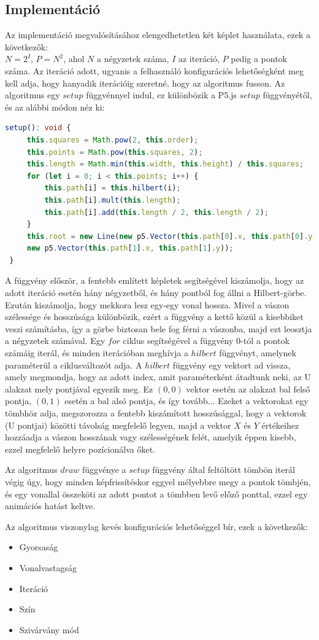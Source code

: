 \subsection*{Implementáció}
Az implementáció megvalósításához elengedhetetlen két képlet használata, ezek a következők:\\
$N = 2^I$,
$P = N^2$, ahol $N$ a négyzetek száma, $I$ az iteráció, $P$ pedig a pontok száma. Az iteráció adott, ugyanis a felhasználó konfigurációs lehetőségként meg kell adja, hogy hanyadik iterációig szeretné, hogy az algoritmus fusson. 
Az algoritmus egy $setup$ függvénnyel indul, ez különbözik a P5.js $setup$ függvényétől, és az alábbi módon néz ki:
\begin{lstlisting}[language=typescript]
 setup(): void {
	 this.squares = Math.pow(2, this.order);
	 this.points = Math.pow(this.squares, 2);
	 this.length = Math.min(this.width, this.height) / this.squares;
	 for (let i = 0; i < this.points; i++) {
		 this.path[i] = this.hilbert(i);
		 this.path[i].mult(this.length);
		 this.path[i].add(this.length / 2, this.length / 2);
	 }
	 this.root = new Line(new p5.Vector(this.path[0].x, this.path[0].y),
	 new p5.Vector(this.path[1].x, this.path[1].y));
 }
\end{lstlisting}
A függvény először, a fentebb említett képletek segítségével kiszámolja, hogy az adott iteráció esetén hány négyzetből, és hány pontból fog állni a Hilbert-görbe. Ezután kiszámolja, hogy mekkora lesz egy-egy vonal hossza. Mivel a vászon szélessége és hosszúsága különbözik, ezért a függvény a kettő közül a kisebbiket veszi számításba, így a görbe biztosan bele fog férni a vászonba, majd ezt leosztja a négyzetek számával. Egy $for$ ciklus segítségével a függvény 0-tól a pontok számáig iterál, és minden iterációban meghívja a $hilbert$ függvényt, amelynek paraméterül a ciklusváltozót adja. A $hilbert$ függvény egy vektort ad vissza, amely megmondja, hogy az adott index, amit paraméterként átadtunk neki, az U alakzat mely pontjával egyezik meg. Ez $(0, 0)$ vektor esetén az alakzat bal felső pontja, $(0, 1)$ esetén a bal alsó pontja, és így tovább... Ezeket a vektorokat egy tömbhöz adja, megszorozza a fentebb kiszámított hosszúsággal, hogy a vektorok (U pontjai) közötti távolság megfelelő legyen, majd a vektor $X$ és $Y$ értékeihez hozzáadja a vászon hosszának vagy szélességének felét, amelyik éppen kisebb, ezzel megfelelő helyre pozícionálva őket.
\par Az algoritmus $draw$ függvénye a $setup$ függvény által feltöltött tömbön iterál végig úgy, hogy minden képfrissítéskor eggyel mélyebbre megy a pontok tömbjén, és egy vonallal összeköti az adott pontot a tömbben levő előző ponttal, ezzel egy animációs hatást keltve. 
\par Az algoritmus viszonylag kevés konfigurációs lehetőséggel bír, ezek a következők:
\begin{itemize}
	\item Gyorsaság
	\item Vonalvastagság
	\item Iteráció
	\item Szín
	\item Szivárvány mód
\end{itemize}
